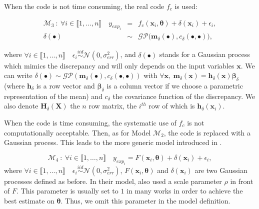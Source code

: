 \documentclass[soumission]{jsfds}
\edef\hc{\string: }
\begin{document}
When the code is not time consuming, the real code $f_c$ is used\hc

\begin{eqnarray}
\mathcal{M}_3 \ : \ \forall i \in \llbracket1,\dots,n\rrbracket \quad y_{exp_i}&=& f_c(\boldsymbol{x}_i,\boldsymbol{\theta})+\delta(\boldsymbol{x}_i)+\epsilon_i,
\label{eq:M3}\\
\delta(\bullet) & \sim &{\mathcal{GP}}{\Big(\boldsymbol{m}_{\delta}(\bullet),c_{\delta}(\bullet,\bullet)\Big)},
\nonumber
\end{eqnarray}

where $\forall i \in \llbracket1,\dots,n\rrbracket \quad \epsilon_i\overset{iid}{\sim}\mathcal{N}(0,\sigma_{err}^2)$, and $\delta(\bullet)$ stands for a Gaussian process which mimics the discrepancy and will only depends on the input variables $\boldsymbol{x}$. We can write $\delta(\bullet)\sim\mathcal{GP}(\boldsymbol{m}_{\delta}(\bullet),c_{\delta}(\bullet,\bullet))$ with $\forall \boldsymbol{x}, \ \boldsymbol{m}_{\delta}(\boldsymbol{x})={\boldsymbol{h}_{\delta}}(\boldsymbol{x})\boldsymbol{\beta}_{\delta}$ (where $\boldsymbol{h}_{\delta}$ is a row vector and $\boldsymbol{\beta}_{\delta}$ is a column vector if we choose a parametric representation of the mean) and $c_{\delta}$ the covariance function of the discrepancy. We also denote $\boldsymbol{H}_{\delta}(\boldsymbol{X})$ the $n$ row matrix, the $i^{th}$ row of which is $\boldsymbol{h}_{\delta}(\boldsymbol{x}_i)$.\newline

When the code is time consuming, the systematic use of $f_c$ is not computationally acceptable.
Then, as for Model $\mathcal{M}_2$, the code is replaced with a Gaussian process. This leads to the more generic model introduced in \citet{kennedy2001}.

% 

\begin{equation}
\mathcal{M}_4 \ : \ \forall i \in \llbracket1,\dots,n\rrbracket \quad y_{exp_i}= F(\boldsymbol{x}_i,\boldsymbol{\theta})+\delta(\boldsymbol{x}_i)+\epsilon_i,
\label{eq:M3p}
\end{equation}
where $\forall i \in \llbracket1,\dots,n\rrbracket \quad \epsilon_i\overset{iid}{\sim}\mathcal{N}(0,\sigma_{err}^2)$, $F(\boldsymbol{x}_i,\boldsymbol{\theta})$ and $\delta(\boldsymbol{x}_i)$ are two Gaussian
processes defined as before.
In their model, \citet{kennedy2001} also used a scale parameter $\rho$ in front of $F$.
This parameter is usually set to $1$ in many works  in order to achieve the best estimate on $\boldsymbol{\theta}$.
Thus, we omit this parameter in the model definition.
\newline
\end{document}
